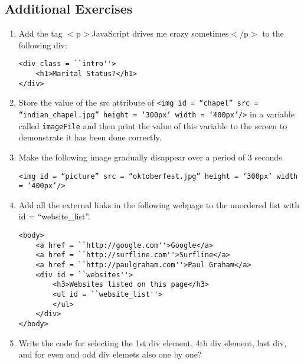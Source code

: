 \documentclass[11pt,a4paper]{article}
\begin{document}
\subsection*{Additional Exercises}
\begin{enumerate}
\item Add the tag $<$p$>$JavaScript drives me crazy sometimes$<$/p$>$ to the following div:
\begin{lstlisting}
<div class = ``intro''>
    <h1>Marital Status?</h1>
</div>
\end{lstlisting}

\item Store the value of the src attribute of \texttt{<img id = ``chapel'' src = ``indian\_chapel.jpg'' height = `300px' width = `400px'/>} in a variable called \texttt{imageFile} and then print the value of this variable to the screen to demonstrate it has been done correctly.
\item Make the following image gradually disappear over a period of 3 seconds. \

\texttt{<img id = ``picture'' src = ``oktoberfest.jpg'' height = `300px' width = `400px'/>}
\item Add all the external links in the following webpage to the unordered list with id = ``website\_list''.
\begin{lstlisting}
<body>
    <a href = ``http://google.com''>Google</a>
    <a href = ``http://surfline.com''>Surfline</a>
    <a href = ``http://paulgraham.com''>Paul Graham</a>
    <div id = ``websites''>
        <h3>Websites listed on this page</h3>
        <ul id = ``website_list''>
        </ul>
    </div>
</body>
\end{lstlisting}
\item Write the code for selecting the 1st div element, 4th div element, last div, and for even and odd div elemets also one by one?
\end{enumerate}
\end{document}
